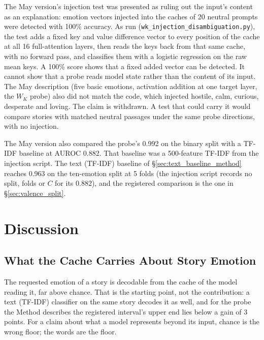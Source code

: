 \documentclass[11pt,a4paper]{article}
\begin{document}
The May version's injection test was presented as ruling out the input's content as an explanation: emotion vectors injected into the caches of 20 neutral prompts were detected with 100\% accuracy. As run (\texttt{wk\_injection\_disambiguation.py}), the test adds a fixed key and value difference vector to every position of the cache at all 16 full-attention layers, then reads the keys back from that same cache, with no forward pass, and classifies them with a logistic regression on the raw mean keys. A 100\% score shows that a fixed added vector can be detected. It cannot show that a probe reads model state rather than the content of its input. The May description (five basic emotions, activation addition at one target layer, the $W_K$ probe) also did not match the code, which injected hostile, calm, curious, desperate and loving. The claim is withdrawn. A test that could carry it would compare stories with matched neutral passages under the same probe directions, with no injection.

The May version also compared the probe's 0.992 on the binary split with a TF-IDF baseline at AUROC 0.882. That baseline was a 500-feature TF-IDF from the injection script. The text (TF-IDF) baseline of \S\ref{sec:text_baseline_method} reaches 0.963 on the ten-emotion split at 5 folds (the injection script records no split, folds or $C$ for its 0.882), and the registered comparison is the one in \S\ref{sec:valence_split}.

\section{Discussion}

\subsection{What the Cache Carries About Story Emotion}

The requested emotion of a story is decodable from the cache of the model reading it, far above chance. That is the starting point, not the contribution: a text (TF-IDF) classifier on the same story decodes it as well, and for the probe the Method describes the registered interval's upper end lies below a gain of 3 points. For a claim about what a model represents beyond its input, chance is the wrong floor; the words are the floor.
\end{document}
